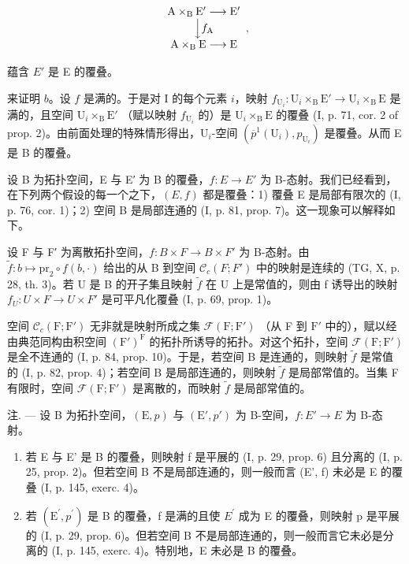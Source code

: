 \[
\begin{array}{c} \mathrm {A\times_ {B} E^ {\prime}} \longrightarrow \mathrm {E^ {\prime}} \\ \Big \downarrow f _ {\mathrm{A}} \\ \mathrm {A\times_ {B} E} \longrightarrow \mathrm{E} \end{array} ,
\]

蕴含 \(E'\) 是 E 的覆叠。

来证明 \(b\)。设 \(f\) 是满的。于是对 I 的每个元素 \(i\)，映射 \(f_{\mathrm{U}_i}\colon \mathrm{U}_i\times_{\mathrm{B}}\mathrm{E}'\to \mathrm{U}_i\times_{\mathrm{B}}\mathrm{E}\) 是满的，且空间 \(\mathrm{U}_i\times_{\mathrm{B}}\mathrm{E}'\) （赋以映射 \(f_{\mathrm{U}_i}\) 的）是 \(\mathrm{U}_i\times_{\mathrm{B}}\mathrm{E}\) 的覆叠 (I, p. 71, cor. 2 of prop. 2)。由前面处理的特殊情形得出，\(\mathrm{U}_i\)-空间 \((\overline{p}^{1}(\mathrm{U}_{i}),p_{\mathrm{U}_{i}})\) 是覆叠。从而 E 是 B 的覆叠。

设 B 为拓扑空间，E 与 E′ 为 B 的覆叠，\(f: E \rightarrow E'\) 为 B-态射。我们已经看到，在下列两个假设的每一个之下，\((E, f)\) 都是覆叠：1) 覆叠 E 是局部有限次的 (I, p. 76, cor. 1)；2) 空间 B 是局部连通的 (I, p. 81, prop. 7)。这一现象可以解释如下。

设 F 与 F′ 为离散拓扑空间，\(f: B \times F \to B \times F'\) 为 B-态射。由 \(\widetilde{f}: b \mapsto \mathrm{pr}_{2} \circ f(b, \cdot)\) 给出的从 B 到空间 \(\mathcal{C}_{c}(F; F')\) 中的映射是连续的 (TG, X, p. 28, th. 3)。若 U 是 B 的开子集且映射 \(\widetilde{f}\) 在 U 上是常值的，则由 f 诱导出的映射 \(f_{U}: U \times F \to U \times F'\) 是可平凡化覆叠 (I, p. 69, prop. 1)。

空间 \(\mathcal{C}_c(\mathrm{F};\mathrm{F}')\) 无非就是映射所成之集 \(\mathcal{F}(\mathrm{F};\mathrm{F}')\) （从 F 到 \(\mathrm{F}'\) 中的），赋以经由典范同构由积空间 \((\mathrm{F}')^{\mathrm{F}}\) 的拓扑所诱导的拓扑。对这个拓扑，空间 \(\mathcal{F}(\mathrm{F};\mathrm{F}')\) 是全不连通的 (I, p. 84, prop. 10)。于是，若空间 B 是连通的，则映射 \(\widetilde{f}\) 是常值的 (I, p. 82, prop. 4)；若空间 B 是局部连通的，则映射 \(\widetilde{f}\) 是局部常值的。当集 F 有限时，空间 \(\mathcal{F}(\mathrm{F};\mathrm{F}')\) 是离散的，而映射 \(\widetilde{f}\) 是局部常值的。

注. --- 设 B 为拓扑空间，\((\mathrm{E}, p)\) 与 \((\mathrm{E}', p')\) 为 B-空间，\(f: E' \to E\) 为 B-态射。

\begin{enumerate}
\def\labelenumi{\alph{enumi})}
\item
  若 E 与 E' 是 B 的覆叠，则映射 f 是平展的 (I, p. 29, prop. 6) 且分离的 (I, p. 25, prop. 2)。但若空间 B 不是局部连通的，则一般而言 (E', f) 未必是 E 的覆叠 (I, p. 145, exerc. 4)。
\item
  若 \((\mathrm{E}^{\prime}, p^{\prime})\) 是 B 的覆叠，f 是满的且使 \(E^{\prime}\) 成为 E 的覆叠，则映射 p 是平展的 (I, p. 29, prop. 6)。但若空间 B 不是局部连通的，则一般而言它未必是分离的 (I, p. 145, exerc. 4)。特别地，E 未必是 B 的覆叠。
\end{enumerate}

